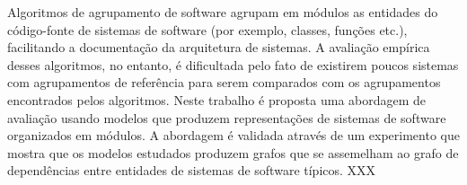 Algoritmos de agrupamento de software agrupam em módulos as entidades do código-fonte de sistemas de software (por exemplo, classes, funções etc.), facilitando a documentação da arquitetura de sistemas. A avaliação empírica desses algoritmos, no entanto, é dificultada pelo fato de existirem poucos sistemas com agrupamentos de referência para serem comparados com os agrupamentos encontrados pelos algoritmos. Neste trabalho é proposta uma abordagem de avaliação usando modelos que produzem representações de sistemas de software organizados em módulos. A abordagem é validada através de um experimento que mostra que os modelos estudados produzem grafos que se assemelham ao grafo de dependências entre entidades de sistemas de software típicos. XXX
